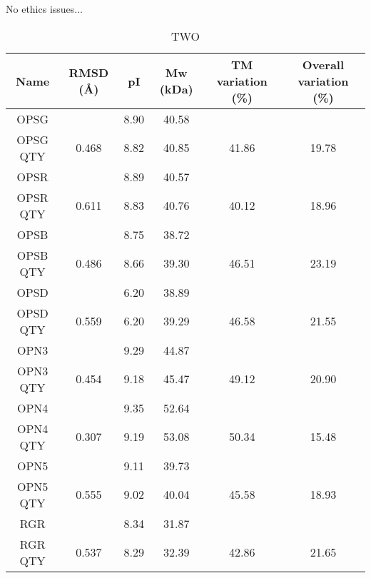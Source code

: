 \documentclass[fleqn,10pt,lineno]{manuscript}
\begin{document}
No ethics issues...




\begin{table}[]
	\centering
	\caption{TWO}
	\label{tb:2}
	\begin{tabular}{cccccc}
		\toprule
		Name     & RMSD (\AA) & pI   & Mw (kDa) & TM variation (\%) & Overall variation (\%) \\
		\toprule
		OPSG     &                 & 8.90 & 40.58    &                   &                        \\
		OPSG QTY & 0.468           & 8.82 & 40.85    & 41.86             & 19.78                  \\
		\midrule
		OPSR     &                 & 8.89 & 40.57    &                   &                        \\
		OPSR QTY & 0.611           & 8.83 & 40.76    & 40.12             & 18.96                  \\
		\midrule
		OPSB     &                 & 8.75 & 38.72    &                   &                        \\
		OPSB QTY & 0.486           & 8.66 & 39.30    & 46.51             & 23.19                  \\
		\midrule
		OPSD     &                 & 6.20 & 38.89    &                   &                        \\
		OPSD QTY & 0.559           & 6.20 & 39.29    & 46.58             & 21.55                  \\
		\midrule
		OPN3     &                 & 9.29 & 44.87    &                   &                        \\
		OPN3 QTY & 0.454           & 9.18 & 45.47    & 49.12             & 20.90                  \\
		\midrule
		OPN4     &                 & 9.35 & 52.64    &                   &                        \\
		OPN4 QTY & 0.307           & 9.19 & 53.08    & 50.34             & 15.48                  \\
		\midrule
		OPN5     &                 & 9.11 & 39.73    &                   &                        \\
		OPN5 QTY & 0.555           & 9.02 & 40.04    & 45.58             & 18.93                  \\
		\midrule
		RGR      &                 & 8.34 & 31.87    &                   &                        \\
		RGR QTY  & 0.537           & 8.29 & 32.39    & 42.86             & 21.65                  \\

\end{tabular}
\end{table}
\end{document}
